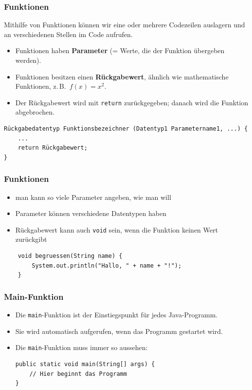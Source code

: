 \documentclass{../../presentation}
\begin{document}
\begin{frame}[fragile]
    \frametitle{Funktionen}
    Mithilfe von Funktionen können wir eine oder mehrere Codezeilen auslagern und an verschiedenen Stellen im Code aufrufen.
    \begin{itemize}
        \item Funktionen haben \textbf{Parameter} (= Werte, die der Funktion übergeben werden).
        \item Funktionen besitzen einen \textbf{Rückgabewert}, ähnlich wie mathematische Funktionen, z.\,B.\ $f(x) = x^2$.
        \item Der Rückgabewert wird mit \texttt{return} zurückgegeben; danach wird die Funktion abgebrochen.
    \end{itemize}
    \begin{verbatim}
Rückgabedatentyp Funktionsbezeichner (Datentyp1 Parametername1, ...) {
    ...
    return Rückgabewert;
}
\end{verbatim}
\end{frame}

\begin{frame}[fragile]
    \frametitle{Funktionen}
    \begin{itemize}
        \item man kann so viele Parameter angeben, wie man will
        \item Parameter können verschiedene Datentypen haben
        \item Rückgabewert kann auch \texttt{void} sein, wenn die Funktion keinen Wert zurückgibt
    \end{itemize}
    \begin{verbatim}
    void begruessen(String name) {
        System.out.println("Hallo, " + name + "!");
    }
    \end{verbatim}
\end{frame}


\begin{frame}[fragile]
    \frametitle{Main-Funktion}
    \begin{itemize}
        \item Die \texttt{main}-Funktion ist der Einstiegspunkt für jedes Java-Programm.
        \item Sie wird automatisch aufgerufen, wenn das Programm gestartet wird.
        \item Die \texttt{main}-Funktion muss immer so aussehen:
              \begin{verbatim}
public static void main(String[] args) {
    // Hier beginnt das Programm
}
\end{verbatim}
    \end{itemize}
\end{frame}
\end{document}
